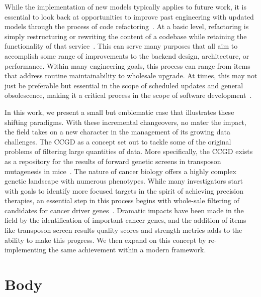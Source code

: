 \documentclass[10pt]{report}
\begin{document}
While the implementation of new models typically applies to future work, it is essential to look back at opportunities to improve past engineering with updated models through the process of code refactoring~\cite{fowlerRefactoringImprovingDesign1999}. At a basic level, refactoring is simply restructuring or rewriting the content of a codebase while retaining the functionality of that service~\cite{kerievskyRefactoringPatterns2004}. This can serve many purposes that all aim to accomplish some range of improvements to the backend design, architecture, or performance. Within many engineering goals, this process can range from items that address routine maintainability to wholesale upgrade. At times, this may not just be preferable but essential in the scope of scheduled updates and general obsolescence, making it a critical process in the scope of software development~\cite{kerievskyRefactoringPatterns2004}.

In this work, we present a small but emblematic case that illustrates these shifting paradigms. With these incremental changeovers, no mater the impact, the field takes on a new character in the management of its growing data challenges. The CCGD as a concept set out to tackle some of the original problems of filtering large quantities of data. More specifically, the CCGD exists as a repository for the results of forward genetic screens in transposon mutagenesis in mice~\cite{abbottCandidateCancerGene2015a}. The nature of cancer biology offers a highly complex genetic landscape with numerous phenotypes. While many investigators start with goals to identify more focused targets in the spirit of achieving precision therapies, an essential step in this process begins with whole-sale filtering of candidates for cancer driver genes~\cite{clarkCancerGeneDiscovery2019}. Dramatic impacts have been made in the field by the identification of important cancer genes, and the addition of items like transposon screen results quality scores and strength metrics adds to the ability to make this progress. We then expand on this concept by re-implementing the same achievement within a modern framework.




\chapter{Body}
\end{document}
